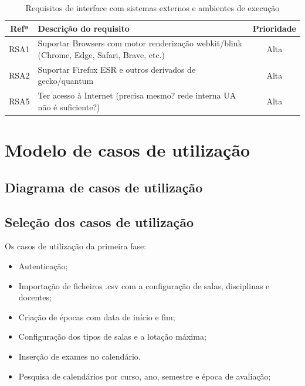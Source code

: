 \documentclass[11pt, twoside]{report}
\begin{document}
	
	
	
	\begin{table}[H]
		\caption{Requisitos de interface com sistemas externos e ambientes de execução}
		\begin{center}
			\begin{tabularx}{\textwidth}{|c|X|c|}
				\hline
				\textbf{Refª }	& \textbf{Descrição do requisito} & \textbf{Prioridade}\\
				\hline
				RSA1 & Suportar Browsers com motor renderização webkit/blink (Chrome, Edge, Safari, Brave, etc.)  & Alta \\
				\hline
				RSA2 & Suportar Firefox ESR e outros derivados de gecko/quantum & Alta \\
				\hline
				RSA5 & Ter acesso à Internet (precisa mesmo? rede interna UA não é suficiente?) & Alta\\
				\hline
			\end{tabularx}
			\label{requisitosdesistemas}
		\end{center}
	\end{table}
		
	
	\chapter{Modelo de casos de utilização}
	\section{Diagrama de casos de utilização}
	\section{Seleção dos casos de utilização}
	
	Os casos de utilização da primeira fase:
	
	\begin{itemize}
		\item Autenticação;
		\item Importação de ficheiros .csv com a configuração de salas, disciplinas e docentes;
	 	\item Criação de épocas com data de início e fim;
	 	\item Configuração dos tipos de salas e a lotação máxima;
	 	\item Inserção de exames no calendário.
	 	\item Pesquisa de calendários por curso, ano, semestre e época de avaliação;
	\end{itemize}
	
\end{document}
